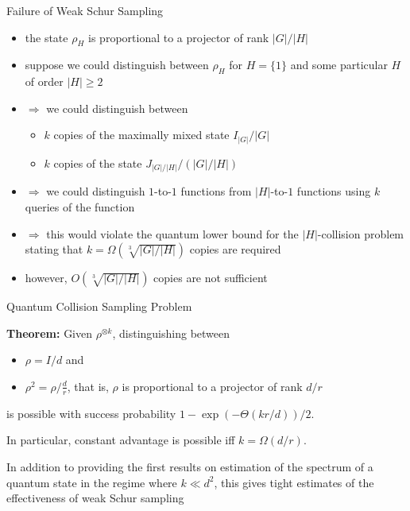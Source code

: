 \documentclass[slideColor]{prosper}
\renewcommand{\>}{\rangle}
\newcommand{\<}{\langle}
\begin{document}
\begin{slide}{Failure of Weak Schur Sampling}
\begin{itemize}
\item the state $\rho_H$ is proportional to a projector of rank $|G|/|H|$
\item suppose we could distinguish between $\rho_H$ for $H=\{1\}$ and some particular $H$ of order $|H| \ge 2$
\item $\Rightarrow$ we could distinguish between 
\begin{itemize}
\item $k$ copies of the maximally mixed state $I_{|G|}/|G|$
\item $k$ copies of the state $J_{|G|/|H|}/(|G|/|H|)$
\end{itemize}
\item $\Rightarrow$ we could distinguish $1$-to-$1$ functions from $|H|$-to-$1$ functions using $k$ queries of the function
\item $\Rightarrow$ this would violate the quantum lower bound for the $|H|$-collision problem stating that $k=\Omega(\sqrt[3]{|G|/|H|})$ copies are required 
\item however, $O(\sqrt[3]{|G|/|H|})$ copies are not sufficient
\end{itemize}

\end{slide}


\begin{slide}{Quantum Collision Sampling Problem}

{\bf Theorem:}
Given $\rho^{\otimes k}$, distinguishing between
\begin{itemize}
\item $\rho =
I/d$ and 
\item $\rho^2 = \rho/\frac{d}{r}$, that is, $\rho$ is proportional to a projector of rank $d/r$
\end{itemize} 
is possible with success probability $1 - \exp(-\Theta(kr/d))/2$.  

In particular, constant advantage is possible iff $k=\Omega(d/r)$.

\bigskip
In addition to providing the first results on estimation of the spectrum of a quantum state in the regime where $k \ll d^2$, this gives tight estimates of the effectiveness of weak Schur sampling

\end{slide}
\end{document}
